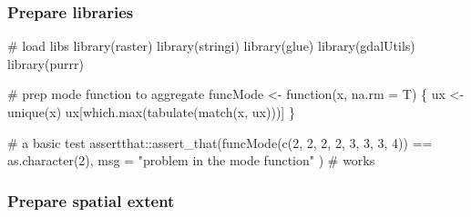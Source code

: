 \documentclass[]{article}
\newenvironment{Shaded}{}{}
\newcommand{\CommentTok}[1]{\textcolor[rgb]{0.00,0.50,0.00}{#1}}
\newcommand{\ControlFlowTok}[1]{\textcolor[rgb]{0.00,0.00,1.00}{#1}}
\newcommand{\DataTypeTok}[1]{#1}
\newcommand{\DecValTok}[1]{#1}
\newcommand{\FloatTok}[1]{#1}
\newcommand{\KeywordTok}[1]{\textcolor[rgb]{0.00,0.00,1.00}{#1}}
\newcommand{\NormalTok}[1]{#1}
\newcommand{\OperatorTok}[1]{#1}
\newcommand{\StringTok}[1]{\textcolor[rgb]{0.00,0.50,0.50}{#1}}
\begin{document}
\hypertarget{prepare-libraries}{%
\subsubsection{Prepare libraries}\label{prepare-libraries}}

\begin{Shaded}
\begin{Highlighting}[]

\CommentTok{# load libs}
\KeywordTok{library}\NormalTok{(raster)}
\KeywordTok{library}\NormalTok{(stringi)}
\KeywordTok{library}\NormalTok{(glue)}
\KeywordTok{library}\NormalTok{(gdalUtils)}
\KeywordTok{library}\NormalTok{(purrr)}

\CommentTok{# prep mode function to aggregate}
\NormalTok{funcMode <-}\StringTok{ }\ControlFlowTok{function}\NormalTok{(x, }\DataTypeTok{na.rm =}\NormalTok{ T) \{}
\NormalTok{  ux <-}\StringTok{ }\KeywordTok{unique}\NormalTok{(x)}
\NormalTok{  ux[}\KeywordTok{which.max}\NormalTok{(}\KeywordTok{tabulate}\NormalTok{(}\KeywordTok{match}\NormalTok{(x, ux)))]}
\NormalTok{\}}

\CommentTok{# a basic test}
\NormalTok{assertthat}\OperatorTok{::}\KeywordTok{assert_that}\NormalTok{(}\KeywordTok{funcMode}\NormalTok{(}\KeywordTok{c}\NormalTok{(}\DecValTok{2}\NormalTok{, }\DecValTok{2}\NormalTok{, }\DecValTok{2}\NormalTok{, }\DecValTok{2}\NormalTok{, }\DecValTok{3}\NormalTok{, }\DecValTok{3}\NormalTok{, }\DecValTok{3}\NormalTok{, }\DecValTok{4}\NormalTok{)) }\OperatorTok{==}\StringTok{ }\KeywordTok{as.character}\NormalTok{(}\DecValTok{2}\NormalTok{),}
  \DataTypeTok{msg =} \StringTok{"problem in the mode function"}
\NormalTok{) }\CommentTok{# works}
\end{Highlighting}
\end{Shaded}

\hypertarget{prepare-spatial-extent}{%
\subsubsection{Prepare spatial extent}\label{prepare-spatial-extent}}

\begin{Shaded}
\end{Shaded}
\end{document}
